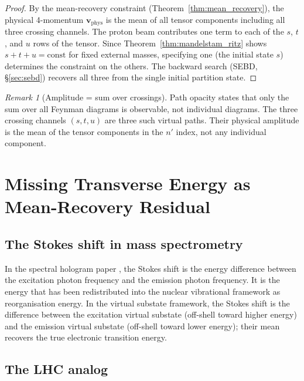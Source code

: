 \documentclass[twocolumn,10pt,a4paper]{article}
\theoremstyle{thmstyle}
\theoremstyle{definition}
\theoremstyle{remark}
\newtheorem{remark}[theorem]{Remark}
\begin{document}
\begin{proof}
By the mean-recovery constraint (Theorem~\ref{thm:mean_recovery}),
the physical 4-momentum $\mathbf{v}_\text{phys}$ is the mean of all
tensor components including all three crossing channels.  The proton beam
contributes one term to each of the $s$, $t$, and $u$ rows of the tensor.
Since Theorem~\ref{thm:mandelstam_ritz} shows $s + t + u = \text{const}$
for fixed external masses, specifying one (the initial state $s$) determines
the constraint on the others.  The backward search (SEBD, §\ref{sec:sebd})
recovers all three from the single initial partition state.
\end{proof}

\begin{remark}[Amplitude = sum over crossings]
Path opacity \citep{companion:trajectory} states that only the sum over
all Feynman diagrams is observable, not individual diagrams.  The three
crossing channels $(s, t, u)$ are three such virtual paths.  Their
physical amplitude is the mean of the tensor components in the $n'$ index,
not any individual component.
\end{remark}

\section{Missing Transverse Energy as Mean-Recovery Residual}
\label{sec:etmiss}

\subsection{The Stokes shift in mass spectrometry}

In the spectral hologram paper \citep{companion:hologram}, the Stokes shift
is the energy difference between the excitation photon frequency and the
emission photon frequency.  It is the energy that has been redistributed
into the nuclear vibrational framework as reorganisation energy.
In the virtual substate framework, the Stokes shift is the difference
between the excitation virtual substate (off-shell toward higher energy)
and the emission virtual substate (off-shell toward lower energy);
their mean recovers the true electronic transition energy.

\subsection{The LHC analog}
\end{document}
